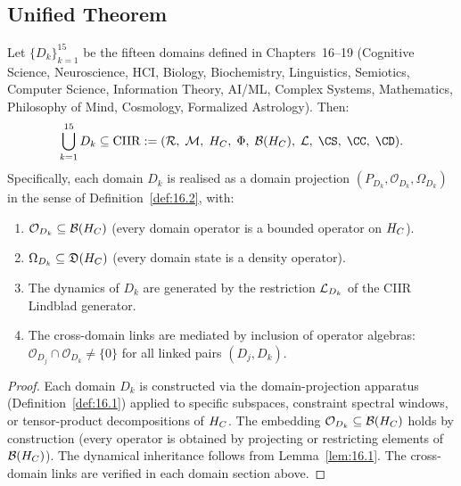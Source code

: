 \subsection{Unified Theorem}
\label{sec:ch19:unified}

\begin{theorem}\label{thm:19.3}
Let $\{D_k\}_{k=1}^{15}$ be the fifteen domains defined in
Chapters~16--19 (Cognitive Science, Neuroscience, HCI, Biology,
Biochemistry, Linguistics, Semiotics, Computer Science, Information
Theory, AI/ML, Complex Systems, Mathematics, Philosophy of Mind,
Cosmology, Formalized Astrology).  Then:
\[
  \bigcup_{k=1}^{15} D_k \subseteq \mathrm{CIIR}
  := (\CR,\; \CM,\; \HC,\; \Phi,\; \CB(\HC),\; \CL,\; \CS,\; \CC,\; \CD).
\]
Specifically, each domain $D_k$ is realised as a domain projection
$(P_{D_k}, \mathcal{O}_{D_k}, \Omega_{D_k})$ in the sense of
Definition~\ref{def:16.2}, with:
\begin{enumerate}
  \item[\textup{(i)}] $\mathcal{O}_{D_k} \subseteq \mathcal{B}(H_C)$ (every
    domain operator is a bounded operator on $H_C$).
  \item[\textup{(ii)}] $\Omega_{D_k} \subseteq \mathfrak{D}(H_C)$
    (every domain state is a density operator).
  \item[\textup{(iii)}] The dynamics of $D_k$ are generated by the
    restriction $\mathcal{L}_{D_k}$ of the CIIR Lindblad generator.
  \item[\textup{(iv)}] The cross-domain links are mediated by
    inclusion of operator algebras:
    $\mathcal{O}_{D_j} \cap \mathcal{O}_{D_k} \neq \{0\}$ for
    all linked pairs $(D_j, D_k)$.
\end{enumerate}
\end{theorem}

\begin{proof}
Each domain $D_k$ is constructed via the domain-projection apparatus
(Definition~\ref{def:16.1}) applied to specific subspaces, constraint
spectral windows, or tensor-product decompositions of $H_C$.  The
embedding $\mathcal{O}_{D_k} \subseteq \mathcal{B}(H_C)$ holds by
construction (every operator is obtained by projecting or restricting
elements of $\mathcal{B}(H_C)$).  The dynamical inheritance follows from
Lemma~\ref{lem:16.1}.  The cross-domain links are verified in each
domain section above.
\end{proof}


